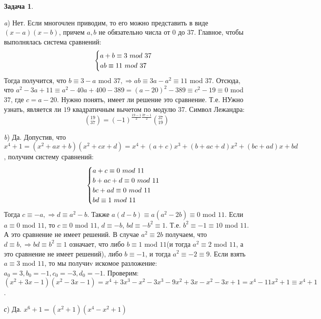 \documentclass[12pt]{article}
\theoremstyle{definition}
\newtheorem{task}{Задача}
\begin{document}
\begin{task} 
\textit{}

\textit{a}) Нет. Если многочлен приводим, то его можно представить в виде $(x-a)(x-b)$, причем $a,b$ не обязательно числа от $0$ до $37$. Главное, чтобы выполнялась система сравнений: 
	\begin{equation*}
		\begin{cases}
   		a+b \equiv 3 $ $mod $ $ 37\\
   		a b \equiv 11 $ $mod $ $ 37
 		\end{cases}
	\end{equation*}
Тогда получится, что $b \equiv 3-a$ mod $37,\Rightarrow ab \equiv 3a-a^2 \equiv 11$ mod $37$. Отсюда, что $a^2-3a+11\equiv a^2-40a+400-389=(a-20)^2-389\equiv c^2-19\equiv 0$ mod $37$, где $c=a-20$. Нужно понять, имеет ли решение это сравнение. Т.е. НУжно узнать, является ли $19$ квадратичным вычетом по модулю 37. Символ Лежандра: 
$$\left(^{19}_{37}\right) = (-1)^{\frac{19-1}{2} \frac{37-1}{2}} \left(^{37}_{19}\right)$$ 
 

\textit{b}) Да. Допустив, что $x^4+1=(x^2+ax+b)(x^2+cx+d)=x^4+(a+c)x^3+(b+ac+d)x^2+(bc+ad)x+bd$, получим систему сравнений:
	\begin{equation*}
		\begin{cases}
   		a+c \equiv 0 $ $mod$ $ 11 \\
   		b+ac+d \equiv 0 $ $mod $ $ 11 \\
   		bc+ad \equiv 0 $ $mod $ $ 11 \\
   		bd \equiv 1 $ $mod $ $ 11
 		\end{cases}
	\end{equation*}
Тогда $c \equiv -a, \Rightarrow d\equiv a^2-b$. Также $a(d-b)\equiv a(a^2-2b)\equiv 0$ mod $11$. Если $a\equiv 0$ mod $11$, то $c\equiv 0$ mod $11$, $d\equiv -b$, $bd\equiv -b^2\equiv 1$. Т.е. $b^2\equiv -1\equiv 10$ mod $11$. А это сравнение не имеет решений. В случае $a^2\equiv 2b$ получаем, что $d\equiv b, \Rightarrow bd\equiv b^2\equiv 1$ означает, что либо $b\equiv 1$ mod $11$(и тогда $a^2\equiv 2$ mod $11$, а это сравнение не имеет решений), либо $b\equiv -1$, и тогда $a^2\equiv -2 \equiv 9$. Если взять $a\equiv 3$ mod $11$, то мы получиv искомое разложение: $a_0=3, b_0=-1, c_0=-3, d_0=-1$. Проверим: $(x^2+3x-1)(x^2-3x-1)=x^4+3x^3-x^2-3x^3-9x^2+3x-x^2-3x+1=x^4-11x^2+1\equiv x^4+1$.

\textit{с}) Да. $x^6+1=(x^2+1)(x^4-x^2+1)$ 

\end{task}
\end{document}
